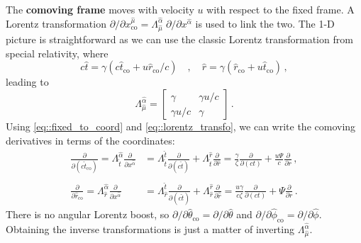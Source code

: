 \documentclass[../main.tex]{subfiles}
\begin{document}
The \textbf{comoving frame} moves with velocity $u$ with respect to the fixed frame.  A Lorentz transformation  $\partial/\partial x_\text{co}^{\hat{\mu}}=\Lambda^{\hat{\alpha}}_{\hat{\mu}}\;\partial/\partial x^{\hat{\alpha}}$ is used to link the two.  The 1-D picture is straightforward as we can use the classic Lorentz transformation from special relativity, where
\begin{equation}
    c\hat{t}=\gamma\left(c\hat{t}_\text{co}+u\hat{r}_\text{co}/c\right)
    \quad,\quad
    \hat{r}=\gamma\left(\hat{r}_\text{co}+u\hat{t}_\text{co}\right)\,,
\end{equation}
leading to
\begin{equation}
    \Lambda^{\hat{\alpha}}_{\hat{\mu}}=\begin{bmatrix}\gamma&\gamma u/c\\\gamma u/c&\gamma\end{bmatrix}\label{eq::lorentz_transfo}\,.
\end{equation}
Using \eqref{eq::fixed_to_coord} and \eqref{eq::lorentz_transfo}, we can write the comoving derivatives in terms of the coordinates:
\begin{align}\label{eq::co_to_coord}
    \frac{\partial}{\partial (c\hat{t}_\text{co})}=\Lambda^{\hat{\alpha}}_{\hat{t}}\frac{\partial}{\partial x^{\hat{\alpha}}} &= \Lambda^{\hat{t}}_{\hat{t}}\frac{\partial}{\partial (c\hat{t})} + \Lambda^{\hat{r}}_{\hat{t}}\frac{\partial}{\partial \hat{r}}\nonumber
    =\frac{\gamma}{\zeta}\frac{\partial}{\partial (ct)}+\frac{u\Psi}{c}\frac{\partial}{\partial r}\,,\nonumber\\\\
    \frac{\partial}{\partial \hat{r}_\text{co}}=\Lambda^{\hat{\alpha}}_{\hat{r}}\frac{\partial}{\partial x^{\hat{\alpha}}} &= \Lambda^{\hat{t}}_{\hat{r}}\frac{\partial}{\partial (c\hat{t})} + \Lambda^{\hat{r}}_{\hat{r}}\frac{\partial}{\partial \hat{r}}\nonumber
    =\frac{u\gamma}{c\zeta}\frac{\partial}{\partial (ct)}+\Psi\frac{\partial}{\partial r} \,.
\end{align}
There is no angular Lorentz boost, so $\partial/\partial\hat{\theta}_\text{co}=\partial/\partial\hat{\theta}$ and $\partial/\partial\hat{\phi}_\text{co}=\partial/\partial\hat{\phi}$.  Obtaining the inverse transformations is just a matter of inverting $\Lambda^{\hat{\alpha}}_{\hat{\mu}}$.

\end{document}

